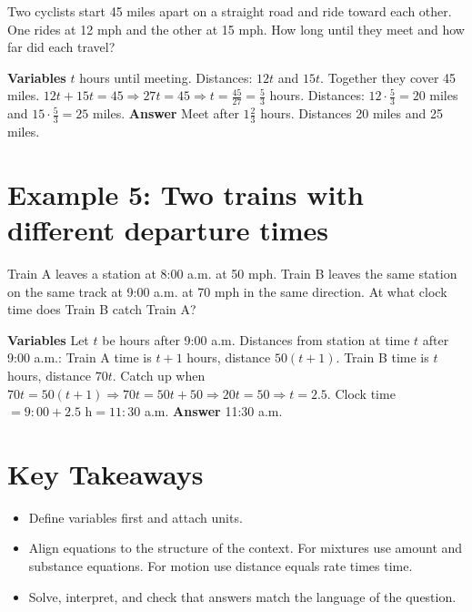 \documentclass[14pt]{extarticle}
\begin{document}
Two cyclists start 45 miles apart on a straight road and ride toward each other. One rides at 12 mph and the other at 15 mph. How long until they meet and how far did each travel?

\textbf{Variables} \(t\) hours until meeting.  
Distances: \(12t\) and \(15t\). Together they cover 45 miles.  
\(12t + 15t = 45 \Rightarrow 27t = 45 \Rightarrow t = \tfrac{45}{27} = \tfrac{5}{3}\) hours.  
Distances: \(12 \cdot \tfrac{5}{3} = 20\) miles and \(15 \cdot \tfrac{5}{3} = 25\) miles.  
\textbf{Answer} Meet after \(1\tfrac{2}{3}\) hours. Distances 20 miles and 25 miles.

\section*{Example 5: Two trains with different departure times}

Train A leaves a station at 8:00 a.m. at 50 mph. Train B leaves the same station on the same track at 9:00 a.m. at 70 mph in the same direction. At what clock time does Train B catch Train A?

\textbf{Variables} Let \(t\) be hours after 9:00 a.m.  
Distances from station at time \(t\) after 9:00 a.m.:  
Train A time is \(t + 1\) hours, distance \(50(t + 1)\).  
Train B time is \(t\) hours, distance \(70t\).  
Catch up when \(70t = 50(t + 1)\Rightarrow 70t = 50t + 50 \Rightarrow 20t = 50 \Rightarrow t = 2.5\).  
Clock time \(= 9{:}00 + 2.5\text{ h} = 11{:}30\) a.m.  
\textbf{Answer} 11:30 a.m.

\section*{Key Takeaways}
\begin{itemize}
  \item Define variables first and attach units.
  \item Align equations to the structure of the context. For mixtures use amount and substance equations. For motion use distance equals rate times time.
  \item Solve, interpret, and check that answers match the language of the question.
\end{itemize}

\newpage

\end{document}
